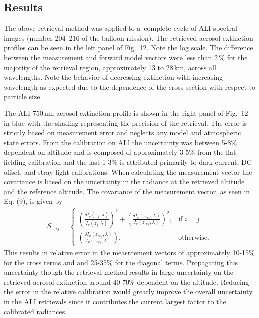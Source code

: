 \documentclass[amtd, online, hvmath]{copernicus}
\begin{document}
\subsection{Results}

The above retrieval method was applied to a~complete cycle of ALI
spectral images (number 204--216 of the balloon mission). The
retrieved aerosol extinction profiles can be seen in the left panel of
Fig.~12. Note the log scale. The difference
between the measurement and forward model vectors were less than
2\,{\%} for the majority of the retrieval region, approximately 13 to
28\,\unit{km}, across all wavelengths. Note the behavior of decreasing
extinction with increasing wavelength as expected due to the
dependence of the cross section with respect to particle size.

The ALI 750\,\unit{nm} aerosol extinction profile is shown in the
right panel of Fig.~12 in blue with the shading representing the
precision of the retrieval. The error is strictly based on measurement
error and neglects any model and atmospheric state errors. From the calibration on ALI the uncertainty was between 5-8\% dependent on altitude and is composed of approximately 3-5\% from the flat fielding calibration and the last 1-3\% is attributed primarily to dark current, DC offset, and stray light calibrations. When calculating the measurement vector the covariance is based on the uncertainty in the radiance at the retrieved altitude and the reference altitude. The covariance of the measurement vector, as seen in Eq. (9), is given by
\begin{align}
S_{\epsilon,ij}=
\begin{cases}
    \left(\frac{\delta I_v(z_{j},\lambda)}{I_v(z_{j},\lambda)}\right)^{2} + \left(\frac{\delta I_v(z_{ref},\lambda)}{I_v(z_{ref},\lambda)}\right)^{2}, & \text{if } i=j\\
    \left(\frac{\delta I_v(z_{ref},\lambda)}{I_v(z_{ref},\lambda)}\right), & \text{otherwise}.
\end{cases}
\end{align}
This results in relative error in the measurement vectors of approximately 10-15\% for the cross terms and and 25-35\% for the diagonal terms. Propagating this uncertainty though the retrieval method results in large uncertainty on the retrieved aerosol extinction around 40-70\% dependent on the altitude. Reducing the error in the relative calibration would greatly improve the overall uncertainty in the ALI retrievals since it contributes the current largest factor to the calibrated radiances.
\end{document}
